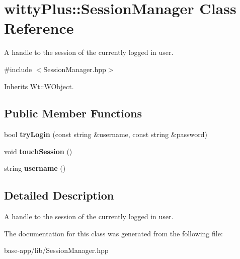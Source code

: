 \hypertarget{classwittyPlus_1_1SessionManager}{
\section{wittyPlus::SessionManager Class Reference}
\label{classwittyPlus_1_1SessionManager}
}


A handle to the session of the currently logged in user.  




{\ttfamily \#include $<$SessionManager.hpp$>$}



Inherits Wt::WObject.

\subsection*{Public Member Functions}
\begin{DoxyCompactItemize}
\item 
\hypertarget{classwittyPlus_1_1SessionManager_a03312532885228ec4af4fee001b849d3}{
bool {\bfseries tryLogin} (const string \&username, const string \&password)}
\label{classwittyPlus_1_1SessionManager_a03312532885228ec4af4fee001b849d3}

\item 
\hypertarget{classwittyPlus_1_1SessionManager_aab97a2718daaaa1f9608e31f4760bcf1}{
void {\bfseries touchSession} ()}
\label{classwittyPlus_1_1SessionManager_aab97a2718daaaa1f9608e31f4760bcf1}

\item 
\hypertarget{classwittyPlus_1_1SessionManager_ae463eea16f1190921d00ec77d4d5f828}{
string {\bfseries username} ()}
\label{classwittyPlus_1_1SessionManager_ae463eea16f1190921d00ec77d4d5f828}

\end{DoxyCompactItemize}


\subsection{Detailed Description}
A handle to the session of the currently logged in user. 

The documentation for this class was generated from the following file:\begin{DoxyCompactItemize}
\item 
base-\/app/lib/SessionManager.hpp\end{DoxyCompactItemize}
